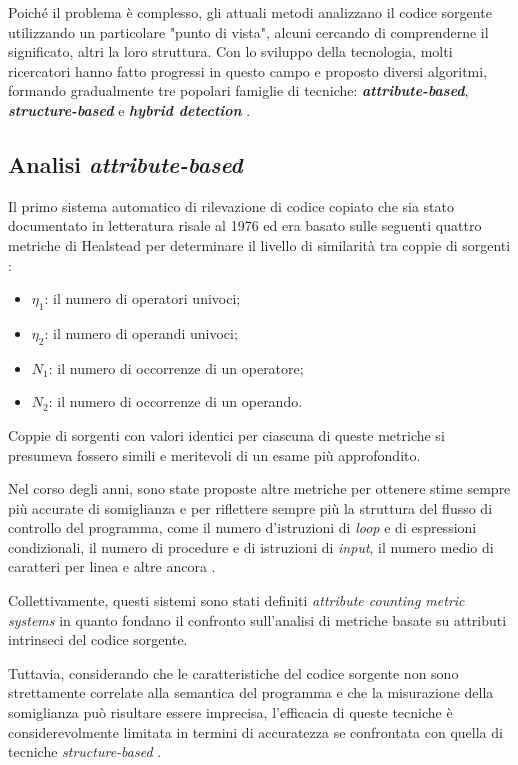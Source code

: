 Poiché il problema è complesso, gli attuali metodi analizzano il codice sorgente utilizzando un particolare "punto di vista", alcuni cercando di comprenderne il significato, altri la loro struttura.
%
Con lo sviluppo della tecnologia, molti ricercatori hanno fatto progressi in questo campo e proposto diversi algoritmi, formando gradualmente tre popolari famiglie di tecniche: \textbf{\textit{attribute-based}}, \textbf{\textit{structure-based}} e \textbf{\textit{hybrid detection}} \cite{es-plag}.

\subsection{Analisi \textit{attribute-based}}
Il primo sistema automatico di rilevazione di codice copiato che sia stato documentato in letteratura risale al 1976 \cite{ottenstein} ed era basato sulle seguenti quattro metriche di Healstead per determinare il livello di similarità tra coppie di sorgenti \cite{halstead}:

\begin{itemize}
    \item $\eta_1$: il numero di operatori univoci;
    \item $\eta_2$: il numero di operandi univoci;
    \item $N_1$: il numero di occorrenze di un operatore;
    \item $N_2$: il numero di occorrenze di un operando.
\end{itemize}

Coppie di sorgenti con valori identici per ciascuna di queste metriche si presumeva fossero simili e meritevoli di un esame più approfondito.

Nel corso degli anni, sono state proposte altre metriche per ottenere stime sempre più accurate di somiglianza e per riflettere sempre più la struttura del flusso di controllo del programma, come il numero d'istruzioni di \textit{loop} e di espressioni condizionali, il numero di procedure e di istruzioni di \textit{input}, il numero medio di caratteri per linea e altre ancora \cite{pdectet}.

Collettivamente, questi sistemi sono stati definiti \textit{attribute counting metric systems} in quanto fondano il confronto sull'analisi di metriche basate su attributi intrinseci del codice sorgente.

Tuttavia, considerando che le caratteristiche del codice sorgente non sono strettamente correlate alla semantica del programma e che la misurazione della somiglianza può risultare essere imprecisa, l'efficacia di queste tecniche è considerevolmente limitata in termini di accuratezza se confrontata con quella di tecniche \textit{structure-based} \cite{es-plag}.


